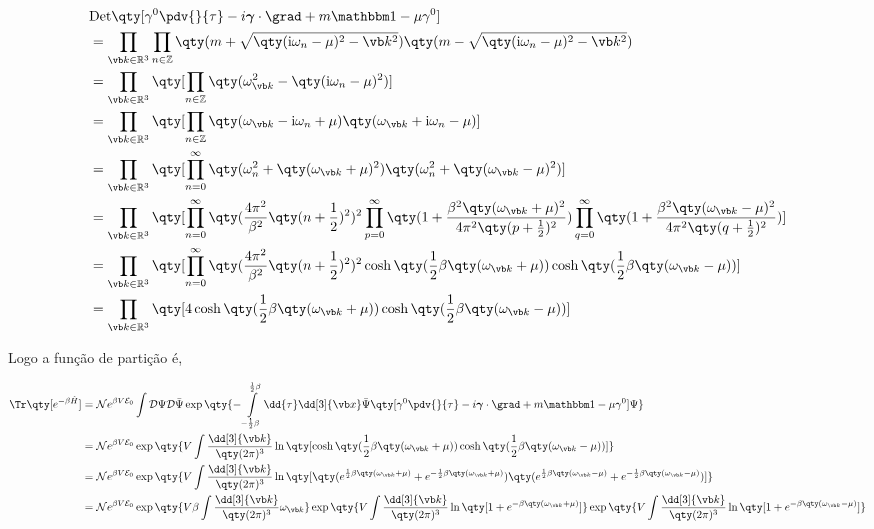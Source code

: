 \documentclass[twoside]{amsart}
\numberwithin{equation}{section}
\newcommand{\Dd}[1]{\mathcal D #1}
\newcommand{\Det}[1]{\textup{Det} #1}
\newcommand{\imm}{\textup{i}}
\begin{document}
\begin{refsection}
\begin{align}
    &\Det\qty[\gamma^0 \pdv{}{\tau}-i\boldsymbol{\gamma}\cdot \grad+m\mathbbm 1-\mu\gamma^0]\\
    &=\prod\limits_{\vb k\in\mathbb R^3}\prod\limits_{n\in\mathbb Z}\qty(m+\sqrt{\qty(\imm\omega_n-\mu)^2-\vb k^2})\qty(m-\sqrt{\qty(\imm\omega_n-\mu)^2-\vb k^2})\\
    &=\prod\limits_{\vb k\in\mathbb R^3}\qty[\prod\limits_{n\in\mathbb Z}\qty(\omega_{\vb k}^2-\qty(\imm\omega_n-\mu)^2)]\\
    &=\prod\limits_{\vb k\in\mathbb R^3}\qty[\prod\limits_{n\in\mathbb Z}\qty(\omega_{\vb k}-\imm\omega_n+\mu)\qty(\omega_{\vb k}+\imm\omega_n-\mu)]\\
    &=\prod\limits_{\vb k\in\mathbb R^3}\qty[\prod\limits_{n=0}^{\infty}\qty(\omega_n^2+\qty(\omega_{\vb k}+\mu)^2)\qty(\omega_n^2+\qty(\omega_{\vb k}-\mu)^2)]\\
    &=\prod\limits_{\vb k\in\mathbb R^3}\qty[\prod\limits_{n=0}^\infty\qty(\frac{4\pi^2}{\beta^2}\qty(n+\frac12)^2)^2\prod\limits_{p=0}^{\infty}\qty(1+\frac{\beta^2\qty(\omega_{\vb k}+\mu)^2}{4\pi^2\qty(p+\frac12)^2})\prod\limits_{q=0}^{\infty}\qty(1+\frac{\beta^2\qty(\omega_{\vb k}-\mu)^2}{4\pi^2\qty(q+\frac12)^2})]\\
    &=\prod\limits_{\vb k\in\mathbb R^3}\qty[\prod\limits_{n=0}^\infty\qty(\frac{4\pi^2}{\beta^2}\qty(n+\frac12)^2)^2\cosh\qty(\frac12\beta\qty(\omega_{\vb k}+\mu))\cosh\qty(\frac12\beta\qty(\omega_{\vb k}-\mu))]\\
    &=\prod\limits_{\vb k\in\mathbb R^3}\qty[4\cosh\qty(\frac12\beta\qty(\omega_{\vb k}+\mu))\cosh\qty(\frac12\beta\qty(\omega_{\vb k}-\mu))]
\end{align} 

Logo a função de partição é,

\begin{align}
    \Tr\qty[e^{-\beta\hat H}]&=\mathcal Ne^{\beta V\mathcal E_0}\int\Dd{\Psi}\Dd{\bar\Psi}\exp\qty{-\int\limits_{-\frac12\beta}^{\frac12\beta}\dd{\tau}\dd[3]{\vb x}\bar\Psi\qty[\gamma^0 \pdv{}{\tau}-i\boldsymbol{\gamma}\cdot \grad+m\mathbbm 1-\mu\gamma^0]\Psi}\\
    &=\mathcal Ne^{\beta V\mathcal E_0}\exp\qty{V\int\frac{\dd[3]{\vb k}}{\qty(2\pi)^3}\ln\qty[\cosh\qty(\frac12\beta\qty(\omega_{\vb k}+\mu))\cosh\qty(\frac12\beta\qty(\omega_{\vb k}-\mu))]}\\
    &=\mathcal Ne^{\beta V\mathcal E_0}\exp\qty{V\int\frac{\dd[3]{\vb k}}{\qty(2\pi)^3}\ln\qty[\qty(e^{\frac12\beta\qty(\omega_{\vb k}+\mu)}+e^{-\frac12\beta\qty(\omega_{\vb k}+\mu)})\qty(e^{\frac12\beta\qty(\omega_{\vb k}-\mu)}+e^{-\frac12\beta\qty(\omega_{\vb k}-\mu)})]}\\
    &=\mathcal Ne^{\beta V\mathcal E_0}\exp\qty{V\beta\int\frac{\dd[3]{\vb k}}{\qty(2\pi)^3}\omega_{\vb k}}\exp\qty{V\int\frac{\dd[3]{\vb k}}{\qty(2\pi)^3}\ln\qty[1+e^{-\beta\qty(\omega_{\vb k}+\mu)}]}\exp\qty{V\int\frac{\dd[3]{\vb k}}{\qty(2\pi)^3}\ln\qty[1+e^{-\beta\qty(\omega_{\vb k}-\mu)}]}
\end{align}


\end{refsection}
\end{document}
